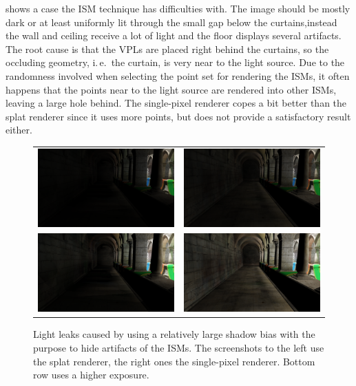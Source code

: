  shows a case the ISM technique has difficulties with. The image should be mostly dark or at least uniformly lit through the small gap below the curtains,instead the wall and ceiling receive a lot of light and the floor displays several artifacts. The root cause is that the VPLs are placed right behind the curtains, so the occluding geometry, i.\,e.\, the curtain, is very near to the light source. Due to the randomness involved when selecting the point set for rendering the ISMs, it often happens that the points near to the light source are rendered into other ISMs, leaving a large hole behind. The single-pixel renderer copes a bit better than the splat renderer since it uses more points, but does not provide a satisfactory result either.



\begin{figure}[htb]
\centering
  \begin{tabular}{@{}cc@{}}
    \includegraphics[width=.48\textwidth]{screenshots/bias_splat} &
    \includegraphics[width=.48\textwidth]{screenshots/bias_single_pixel}\\
      \includegraphics[width=.48\textwidth]{screenshots/bias_splat_exposure} &
      \includegraphics[width=.48\textwidth]{screenshots/bias_single_pixel_exposure}
  \end{tabular}
  \caption{Light leaks caused by using a relatively large shadow bias with the purpose to hide artifacts of the ISMs. The screenshots to the left use the splat renderer, the right ones the single-pixel renderer. Bottom row uses a higher exposure.}
  \label{fig:results:bias}
\end{figure}

